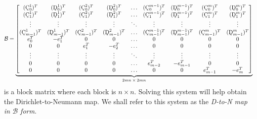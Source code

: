 \documentclass[10pt,reqno,oneside,a4paper]{article}
\begin{document}
\[ 
\mathcal{B} = 
\underbrace{
\begin{bmatrix}
(\textup{\c{C}}^1_0)^T & (\textup{\c{D}}^1_0)^T & (\textup{\c{C}}^2_0)^T & (\textup{\c{D}}^2_0)^T & \ldots & (\textup{\c{C}}^{m-1}_0)^T & (\textup{\c{D}}^{m-1}_0)^T &  (\textup{\c{C}}^m_0)^T & (\textup{\c{D}}^m_0)^T \\
(\textup{\c{C}}^1_1)^T &  (\textup{\c{D}}^1_1)^T & (\textup{\c{C}}^2_1)^T & (\textup{\c{D}}^2_1)^T & \ldots & (\textup{\c{C}}^{m-1}_1)^T& (\textup{\c{D}}^{m-1}_1)^T &(\textup{\c{C}}^m_1)^T& (\textup{\c{D}}^m_1)^T \\
\vdots & \vdots & \vdots & \vdots & \ddots & \vdots & \vdots & \vdots & \vdots \\
(\textup{\c{C}}^1_{m-1})^T & (\textup{\c{D}}^1_{m-1})^T & (\textup{\c{C}}^2_{m-1})^T & (\textup{\c{D}}^2_{m-1})^T & \ldots & (\textup{\c{C}}^{m-1}_{m-1})^T & (\textup{\c{D}}^{m-1}_{m-1})^T & (\textup{\c{C}}^m_{m-1})^T & (\textup{\c{D}}^m_{m-1})^T \\
e_{0}^T & -e_1^T & 0 & 0 & \ldots & 0 & 0 & 0 & 0 \\
0 & 0 & e_{1}^T & -e_2^T & \ldots & 0 & 0 & 0 & 0 \\
\vdots & \vdots & \vdots &  \vdots & \ddots & \vdots & \vdots & \vdots & \vdots\\
0 & 0 & 0 & 0 & \ldots & e_{m-2}^T & -e_{m-1}^T & 0 & 0 \\
0 & 0 & 0 & 0 & \ldots & 0 & 0 & e_{m-1}^T & -e_{m}^T 
\end{bmatrix}}_\text{$2mn \times 2mn$}
\]
is a block matrix where each block is $n \times n.$ Solving this system will help obtain the Dirichlet-to-Neumann map. We shall refer to this system as the \emph{D-to-N map in $\mathcal{B}$ form}. 
\end{document}
